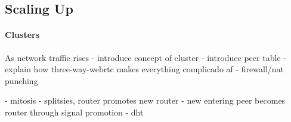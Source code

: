 \subsection{Scaling Up}


\paragraph{Clusters}
As network traffic rises
- introduce concept of cluster
- introduce peer table
- explain how three-way-webrtc makes everything complicado af
    - firewall/nat punching



- mitosis
    - splitsies, router promotes new router
    - new entering peer becomes router through signal promotion
- dht
